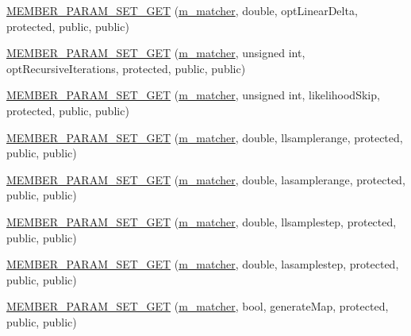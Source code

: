 \begin{DoxyCompactItemize}
\item 
\hyperlink{classGMapping_1_1GridSlamProcessor_ab1d5ded4e425ece05d38a98fbe0a8b2c}{M\+E\+M\+B\+E\+R\+\_\+\+P\+A\+R\+A\+M\+\_\+\+S\+E\+T\+\_\+\+G\+ET} (\hyperlink{classGMapping_1_1GridSlamProcessor_ac50952d259590c4aeba22eee4e6437f5}{m\+\_\+matcher}, double, opt\+Linear\+Delta, protected, public, public)
\item 
\hyperlink{classGMapping_1_1GridSlamProcessor_a52575a11c089158b1a37e74ead526da9}{M\+E\+M\+B\+E\+R\+\_\+\+P\+A\+R\+A\+M\+\_\+\+S\+E\+T\+\_\+\+G\+ET} (\hyperlink{classGMapping_1_1GridSlamProcessor_ac50952d259590c4aeba22eee4e6437f5}{m\+\_\+matcher}, unsigned int, opt\+Recursive\+Iterations, protected, public, public)
\item 
\hyperlink{classGMapping_1_1GridSlamProcessor_a600cd2d77f3662e3c4c6c241be4aaaac}{M\+E\+M\+B\+E\+R\+\_\+\+P\+A\+R\+A\+M\+\_\+\+S\+E\+T\+\_\+\+G\+ET} (\hyperlink{classGMapping_1_1GridSlamProcessor_ac50952d259590c4aeba22eee4e6437f5}{m\+\_\+matcher}, unsigned int, likelihood\+Skip, protected, public, public)
\item 
\hyperlink{classGMapping_1_1GridSlamProcessor_a61ebeb294126d9081b8cb099fc60c6b0}{M\+E\+M\+B\+E\+R\+\_\+\+P\+A\+R\+A\+M\+\_\+\+S\+E\+T\+\_\+\+G\+ET} (\hyperlink{classGMapping_1_1GridSlamProcessor_ac50952d259590c4aeba22eee4e6437f5}{m\+\_\+matcher}, double, llsamplerange, protected, public, public)
\item 
\hyperlink{classGMapping_1_1GridSlamProcessor_ab6234158b112bfd2aba9ce5a063eff78}{M\+E\+M\+B\+E\+R\+\_\+\+P\+A\+R\+A\+M\+\_\+\+S\+E\+T\+\_\+\+G\+ET} (\hyperlink{classGMapping_1_1GridSlamProcessor_ac50952d259590c4aeba22eee4e6437f5}{m\+\_\+matcher}, double, lasamplerange, protected, public, public)
\item 
\hyperlink{classGMapping_1_1GridSlamProcessor_a7a491940692ed37326fc746e27c687bc}{M\+E\+M\+B\+E\+R\+\_\+\+P\+A\+R\+A\+M\+\_\+\+S\+E\+T\+\_\+\+G\+ET} (\hyperlink{classGMapping_1_1GridSlamProcessor_ac50952d259590c4aeba22eee4e6437f5}{m\+\_\+matcher}, double, llsamplestep, protected, public, public)
\item 
\hyperlink{classGMapping_1_1GridSlamProcessor_ae3fb37cdec3e49f4a74d7e5adbeaed75}{M\+E\+M\+B\+E\+R\+\_\+\+P\+A\+R\+A\+M\+\_\+\+S\+E\+T\+\_\+\+G\+ET} (\hyperlink{classGMapping_1_1GridSlamProcessor_ac50952d259590c4aeba22eee4e6437f5}{m\+\_\+matcher}, double, lasamplestep, protected, public, public)
\item 
\hyperlink{classGMapping_1_1GridSlamProcessor_a375b3327975b1d8de93d5b8c4c494463}{M\+E\+M\+B\+E\+R\+\_\+\+P\+A\+R\+A\+M\+\_\+\+S\+E\+T\+\_\+\+G\+ET} (\hyperlink{classGMapping_1_1GridSlamProcessor_ac50952d259590c4aeba22eee4e6437f5}{m\+\_\+matcher}, bool, generate\+Map, protected, public, public)

\end{DoxyCompactItemize}
